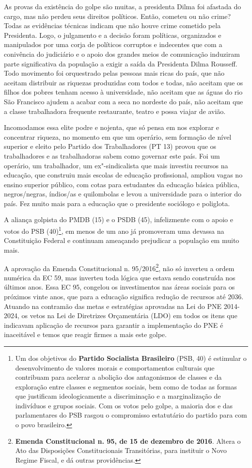 As provas da existência do golpe são muitas, a presidenta Dilma foi
afastada do cargo, mas não perdeu seus direitos políticos. Então,
cometeu ou não crime? Todas as evidências técnicas indicam que não houve
crime cometido pela Presidenta. Logo, o julgamento e a decisão foram
políticas, organizados e manipulados por uma corja de políticos
corruptos e indecentes que com a conivência do judiciário e o apoio dos
grandes meios de comunicação induziram parte significativa da população
a exigir a saída da Presidenta Dilma Rousseff. Todo movimento foi
orquestrado pelas pessoas mais ricas do país, que não aceitam distribuir
as riquezas produzidas com todos e todas, não aceitam que os filhos dos
pobres tenham acesso à universidade, não aceitam que as águas do rio São
Francisco ajudem a acabar com a seca no nordeste do país, não aceitam
que a classe trabalhadora frequente restaurante, teatro e possa viajar
de avião.

Incomodamos essa elite podre e nojenta, que só pensa em nos explorar e
concentrar riqueza, no momento em que um operário, sem formação de nível
superior e eleito pelo Partido dos Trabalhadores (PT 13) provou que os
trabalhadores e as trabalhadoras sabem como governar este país. Foi um
operário, um trabalhador, um ex"-sindicalista que mais investiu recursos
na educação, que construiu mais escolas de educação profissional,
ampliou vagas no ensino superior público, com cotas para estudantes da
educação básica pública, negros/negras, índios/as e quilombolas e levou
a universidade para o interior do país. Fez muito mais para a educação
que o presidente sociólogo e poliglota.

A aliança golpista do PMDB (15) e o PSDB (45), infelizmente com o apoio
e votos do PSB (40)\footnote{Um dos objetivos do \textbf{Partido
  Socialista Brasileiro} (PSB, 40) é estimular o desenvolvimento de
  valores morais e comportamentos culturais que contribuam para acelerar
  a abolição dos antagonismos de classes e da exploração entre classes e
  segmentos sociais, bem como de todas as formas que justificam
  ideologicamente a discriminação e a marginalização de indivíduos e
  grupos sociais. Com os votos pelo golpe, a maioria dos e das
  parlamentares do PSB rasgou o compromisso estatutário do partido para
  com o povo brasileiro.}, em menos de um ano já promoveram uma devassa
na Constituição Federal e continuam ameaçando prejudicar a população em
muito mais.

A aprovação da Emenda Constitucional n. 95/2016\footnote{\textbf{Emenda
  Constitucional n. 95, de 15 de dezembro de 2016}. Altera o Ato das
  Disposições Constitucionais Transitórias, para instituir o Novo Regime
  Fiscal, e dá outras providências.}, não só inverteu a ordem numérica
da EC 59, mas inverteu toda lógica que estava sendo construída nos
últimos anos. Essa EC 95, congelou os investimentos nas áreas sociais
para os próximos vinte anos, que para a educação significa redução de
recursos até 2036. Atuando na contramão das metas e estratégias
aprovadas na Lei do PNE 2014-2024, os vetos na Lei de Diretrizes
Orçamentária (LDO) em todos os itens que indicavam aplicação de recursos
para garantir a implementação do PNE é inaceitável e temos que reagir
firmes a mais este golpe.

